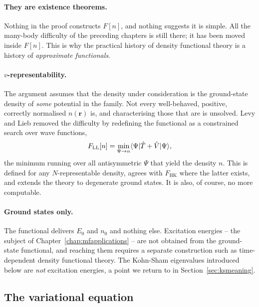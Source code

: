 \paragraph{They are existence theorems.}
Nothing in the proof constructs $F[n]$, and nothing suggests it is simple.
All the many-body difficulty of the preceding chapters is still there; it has
been moved inside $F[n]$.  This is why the practical history of density
functional theory is a history of \emph{approximate functionals}.

\paragraph{$v$-representability.}
The argument assumes that the density under consideration is the ground-state
density of \emph{some} potential in the family.  Not every well-behaved,
positive, correctly normalised $n(\bm{r})$ is, and characterising those that
are is unsolved.  Levy and Lieb removed the difficulty by redefining the
functional as a constrained search over wave functions,
\begin{equation}
  F_{\mathrm{LL}}[n] = \min_{\Psi\to n}
    \langle \Psi | \hat{T}+\hat{V} | \Psi \rangle,
  \label{eq:8-levylieb}
\end{equation}
the minimum running over all antisymmetric $\Psi$ that yield the density $n$.
This is defined for any $N$-representable density, agrees with
$F_{\mathrm{HK}}$ where the latter exists, and extends the theory to
degenerate ground states.  It is also, of course, no more computable.

\paragraph{Ground states only.}
The functional delivers $E_0$ and $n_0$ and nothing else.  Excitation
energies -- the subject of Chapter~\ref{chap:mfapplications} -- are not
obtained from the ground-state functional, and reaching them requires a
separate construction such as time-dependent density functional theory.  The
Kohn-Sham eigenvalues introduced below are \emph{not} excitation energies, a
point we return to in Section~\ref{sec:ksmeaning}.

\subsection{The variational equation}
\label{sec:dftvariational}

